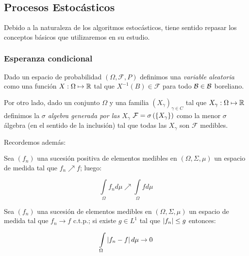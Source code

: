 \subsection{Procesos Estoc\'asticos}

Debido a la naturaleza de los algoritmos estoc\'asticos, tiene sentido repasar los conceptos b\'asicos que utilizaremos en su estudio.

\subsubsection{Esperanza condicional}

Dado un espacio de probabilidad $\left(\Omega, \mathcal{F}, P\right)$ definimos una \textit{variable aleatoria } como una funci\'on $X : \Omega \mapsto {\mathbb{R}}$ tal que $X^{-1}(B) \in \mathcal{F}$ para todo $\mathcal{B} \in \mathcal{B}$ boreliano.

Por otro lado, dado un conjunto $\Omega$ y una familia $\left(X_{\gamma}\right)_{\gamma \in C}$ tal que $X_{\gamma}: \Omega \mapsto {\mathbb{R}}$ definimos la \textit{$\sigma$ algebra generada por las $X_\gamma$} $\mathcal{F} = \sigma\left(\left\lbrace X_{\gamma}\right\rbrace\right)$ como la menor $\sigma$ \'algebra (en el sentido de la inclusi\'on) tal que todas las $X_{\gamma}$ son $\mathcal{F}$ medibles.

Recordemos adem\'as:

\begin{theorem}
	\label{theorem: Convergencia monotona}
	Sea $(f_n)$ una sucesi\'on positiva de elementos medibles en $(\Omega, \Sigma, \mu)$ un espacio de medida tal que $f_n \nearrow f$; luego:
	
	\begin{equation*}
		\int\limits_{\Omega} {f_n d\mu} \nearrow \int\limits_{\Omega}{f d\mu} 
	\end{equation*} 
\end{theorem}

\begin{theorem}
	\label{theorem: Convergencia dominada}
	Sea $(f_n)$ una sucesi\'on de elementos medibles en $(\Omega, \Sigma, \mu)$ un espacio de medida tal que $f_n \rightarrow f$ c.t.p.; si existe $g \in L^1$ tal que $\left\lvert f_n\right\rvert \leq g$ entonces:
	
	\begin{equation*}
	\int\limits_{\Omega} {\left\lvert f_n -f\right\rvert d\mu} \rightarrow 0
	\end{equation*} 
\end{theorem}

